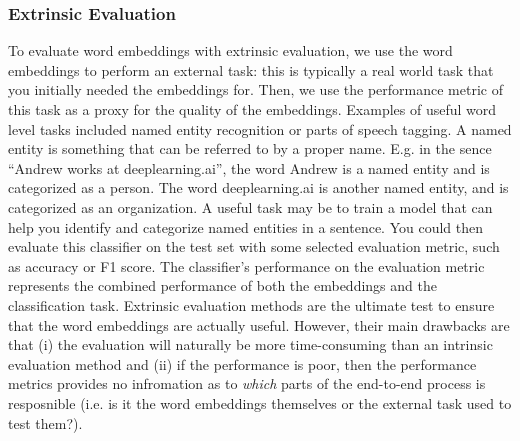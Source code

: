 \documentclass[12pt]{article}
\begin{document}
\subsubsection{Extrinsic Evaluation} To evaluate word embeddings with extrinsic evaluation, we use the word embeddings to perform an external task: this is typically a real world task that you initially needed the embeddings for. Then, we use the performance metric of this task as a proxy for the quality of the embeddings. Examples of useful word level tasks included named entity recognition or parts of speech tagging. A named entity is something that can be referred to by a proper name. E.g. in the sence ``Andrew works at deeplearning.ai'', the word Andrew is a named entity and is categorized as a person. The word deeplearning.ai is another named entity, and is categorized as an organization. A useful task may be to train a model that can help you identify and categorize named entities in a sentence. You could then evaluate this classifier on the test set with some selected evaluation metric, such as accuracy or F1 score. The classifier's performance on the evaluation metric represents the combined performance of both the embeddings and the classification task. Extrinsic evaluation methods are the ultimate test to ensure that the word embeddings are actually useful. However, their main drawbacks are that (i) the evaluation will naturally be more time-consuming than an intrinsic evaluation method and (ii) if the performance is poor, then the performance metrics provides no infromation as to \emph{which} parts of the end-to-end process is resposnible (i.e. is it the word embeddings themselves or the external task used to test them?).
\end{document}
